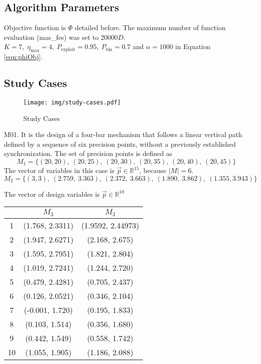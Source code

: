 \documentclass[12pt,letterpape]{article}
\begin{document}
\subsection{Algorithm Parameters} %
\label{sub:algorithm_parameters}

Objective function is $\Phi$ detailed before. The maximum number of function evaluation
(mas\_fes) was set to 20000$D$. $K = 7, \; \eta_{\max} = 4,\ P_{\text{exploit}} = 0.95,\ P_{\text{bin}} = 0.7$ and $\alpha = 1000$ in Equation \ref{eqn:phiObj}.

\subsection{Study Cases} %
\label{sub:study_cases}

\begin{figure}[!ht]
	\centering
	\texttt{[image: img/study-cases.pdf]}
	\caption{Study Cases}
	\label{fig:studycases}
\end{figure}

M01. It is the design of a four-bar mechanism that follows a linear vertical path
defined by a sequence of six precision points, without a previously established
synchronization. The set of precision points is defined as
% 
$$
	M_{1} = \{ (20, 20),\ (20, 25),\ (20, 30),\ (20, 35),\ (20, 40),\ (20, 45) \}
$$
The vector of variables in this case is $ \vec{p} \in \mathbb{R}^{15} $, because
$|M| = 6$. 
%
$$
	M_{2} = \{(3, 3),\ (2.759,\ 3.363),\ (2.372,\ 3.663),\ (1.890,\ 3.862),\ (1.355, 3.943) \}
$$

The vector of design variables is $ \vec{p} \in \mathbb{R}^{10} $

\begin{table}[!ht]
	\centering
	\begin{tabular}{ccc}
			\hline
			  &      $M_{3}$      &       $M_{3}$       \\
			\hline
			1 & (1.768, 2.3311) & (1.9592, 2.44973) \\
			2 & (1.947, 2.6271) & (2.168, 2.675)    \\
			3 & (1.595, 2.7951) & (1.821, 2.804)    \\
			4 & (1.019, 2.7241) & (1.244, 2.720)    \\
			5 & (0.479, 2.4281) & (0.705, 2.437)    \\
			6 & (0.126, 2.0521) & (0.346, 2.104)    \\
			7 & (-0.001, 1.720) & (0.195, 1.833)    \\
			8 & (0.103, 1.514)  & (0.356, 1.680)    \\
			9 & (0.442, 1.549)  & (0.558, 1.742)    \\
		   10 & (1.055, 1.905)  & (1.186, 2.088)    \\
			\hline
	\end{tabular}
\end{table}
\end{document}
